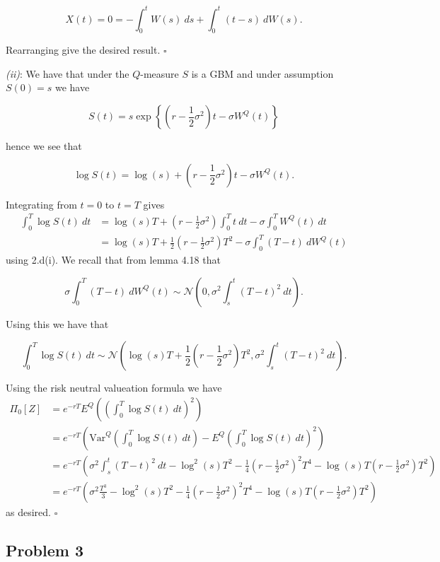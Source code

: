 \documentclass[a4paper,12pt,openany]{book}
\begin{document}
\[
X(t)=0=-\int_0^t W(s)\ ds+\int_0^t(t-s)\ dW(s).
\]

Rearranging give the desired result. \(\square\)

\emph{(ii)}: We have that under the \(Q\)-measure \(S\) is a GBM and under assumption \(S(0)=s\) we have

\[
S(t)=s\exp\left\{\left(r-\frac{1}{2}\sigma^2\right)t - \sigma W^Q(t)\right\}
\]

hence we see that

\[
\log S(t)=\log(s)+\left(r-\frac{1}{2}\sigma^2\right)t - \sigma W^Q(t).
\]

Integrating from \(t=0\) to \(t=T\) gives
\begin{align*}
\int_0^T \log S(t)\ dt&=\log(s)T+\left(r-\frac{1}{2}\sigma^2\right)\int_0^T t\ dt-\sigma\int_0^T W^Q(t)\ dt\\
&=\log(s)T+\frac{1}{2}\left(r-\frac{1}{2}\sigma^2\right)T^2-\sigma\int_0^T (T-t)\ dW^Q(t)
\end{align*}
using 2.d(i). We recall that from lemma 4.18 that

\[
\sigma\int_0^T (T-t)\ dW^Q(t)\sim \mathcal{N}\left(0,\sigma^2\int_s^t(T-t)^2\ dt\right).
\]

Using this we have that

\[
\int_0^T \log S(t)\ dt\sim\mathcal{N}\left(\log(s)T+\frac{1}{2}\left(r-\frac{1}{2}\sigma^2\right)T^2,\sigma^2\int_s^t(T-t)^2\ dt\right).
\]

Using the risk neutral valueation formula we have
\begin{align*}
\Pi_0[Z]&=e^{-rT}E^Q\left(\left(\int_0^T \log S(t)\ dt\right)^2\right)\\
&=e^{-rT}\left(\text{Var}^Q\left(\int_0^T \log S(t)\ dt\right)-E^Q\left(\int_0^T \log S(t)\ dt\right)^2\right)\\
&=e^{-rT}\left(\sigma^2\int_s^t(T-t)^2\ dt-\log^2(s)T^2-\frac{1}{4}\left(r-\frac{1}{2}\sigma^2\right)^2T^4-\log(s)T\left(r-\frac{1}{2}\sigma^2\right)T^2\right)\\
&=e^{-rT}\left(\sigma^2\frac{T^3}{3}-\log^2(s)T^2-\frac{1}{4}\left(r-\frac{1}{2}\sigma^2\right)^2T^4-\log(s)T\left(r-\frac{1}{2}\sigma^2\right)T^2\right)
\end{align*}
as desired. \(\square\)

\noindent\makebox[\linewidth]{\rule{\textwidth}{0.4pt}}

\hypertarget{problem-3-3}{%
\subsection{Problem 3}\label{problem-3-3}}
\end{document}
